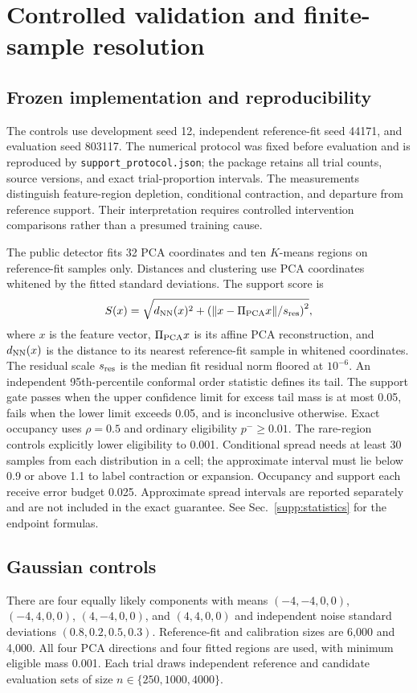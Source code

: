 \section{Controlled validation and finite-sample resolution}
\label{supp:supportcontrols}

\subsection{Frozen implementation and reproducibility}
The controls use development seed 12, independent reference-fit seed 44171,
and evaluation seed 803117. The numerical protocol was fixed before evaluation
and is reproduced by \texttt{support\_protocol.json}; the package retains all
trial counts, source versions, and exact trial-proportion intervals.
The measurements distinguish feature-region depletion, conditional contraction,
and departure from reference support. Their interpretation requires controlled
intervention comparisons rather than a presumed training cause.

The public detector fits 32 PCA coordinates and ten $K$-means regions on
reference-fit samples only. Distances and clustering use PCA coordinates
whitened by the fitted standard deviations. The support score is
\begin{equation}
 S(x)=\sqrt{d_{\rm NN}(x)^2+
  \left(\|x-\Pi_{\rm PCA}x\|/s_{\rm res}\right)^2},
\label{eq:supp_support_score}
\end{equation}
where $x$ is the feature vector, $\Pi_{\rm PCA}x$ is its affine PCA
reconstruction, and $d_{\rm NN}(x)$ is the distance to its nearest
reference-fit sample in whitened coordinates. The residual scale
$s_{\rm res}$ is the median fit residual norm floored at $10^{-6}$.
An independent 95th-percentile conformal order statistic defines its tail.
The support gate passes when the upper confidence limit for excess tail mass
is at most 0.05, fails when the lower limit exceeds 0.05, and is inconclusive
otherwise. Exact occupancy uses $\rho=0.5$ and ordinary eligibility
$p^-\geq0.01$. The rare-region controls explicitly lower eligibility to 0.001.
Conditional spread needs at least 30 samples from each distribution in a cell;
the approximate interval must lie below 0.9 or above 1.1 to label contraction
or expansion. Occupancy and support each receive error budget 0.025.
Approximate spread intervals are reported separately and are not included in
the exact guarantee. See Sec.~\ref{supp:statistics} for the endpoint formulas.

\subsection{Gaussian controls}
There are four equally likely components with means
$(-4,-4,0,0)$, $(-4,4,0,0)$, $(4,-4,0,0)$, and $(4,4,0,0)$ and independent
noise standard deviations $(0.8,0.2,0.5,0.3)$. Reference-fit and calibration
sizes are 6,000 and 4,000. All four PCA directions and four fitted regions are
used, with minimum eligible mass 0.001. Each trial draws independent reference
and candidate evaluation sets of size $n\in\{250,1000,4000\}$.

